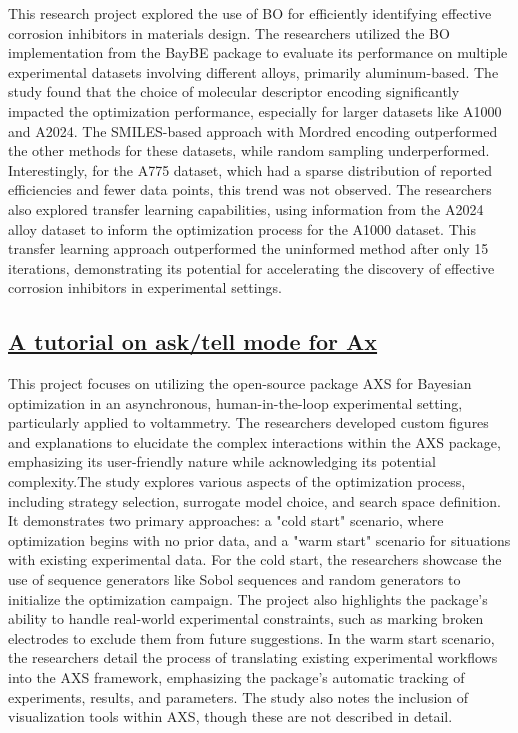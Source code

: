 This research project explored the use of BO for efficiently identifying effective corrosion inhibitors in materials design. The researchers utilized the BO implementation from the BayBE package\cite{fitzner2022baybe} to evaluate its performance on multiple experimental datasets\cite{galvao2022cordata} involving different alloys, primarily aluminum-based. The study found that the choice of molecular descriptor encoding significantly impacted the optimization performance, especially for larger datasets like A1000 and A2024. The SMILES-based approach with Mordred encoding\cite{moriwaki2018mordred} outperformed the other methods for these datasets, while random sampling underperformed. Interestingly, for the A775 dataset, which had a sparse distribution of reported efficiencies and fewer data points, this trend was not observed. The researchers also explored transfer learning capabilities, using information from the A2024 alloy dataset to inform the optimization process for the A1000 dataset. This transfer learning approach outperformed the uninformed method after only 15 iterations, demonstrating its potential for accelerating the discovery of effective corrosion inhibitors in experimental settings.
 \subsection*{\href{https://www.youtube.com/watch?v=X5PDvdXoBdA}{A tutorial on ask/tell mode for Ax}}

This project focuses on utilizing the open-source package AXS for Bayesian optimization in an asynchronous, human-in-the-loop experimental setting, particularly applied to voltammetry. The researchers developed custom figures and explanations to elucidate the complex interactions within the AXS package, emphasizing its user-friendly nature while acknowledging its potential complexity.The study explores various aspects of the optimization process, including strategy selection, surrogate model choice, and search space definition. It demonstrates two primary approaches: a "cold start" scenario, where optimization begins with no prior data, and a "warm start" scenario for situations with existing experimental data. For the cold start, the researchers showcase the use of sequence generators like Sobol sequences and random generators to initialize the optimization campaign. The project also highlights the package's ability to handle real-world experimental constraints, such as marking broken electrodes to exclude them from future suggestions. In the warm start scenario, the researchers detail the process of translating existing experimental workflows into the AXS framework, emphasizing the package's automatic tracking of experiments, results, and parameters. The study also notes the inclusion of visualization tools within AXS, though these are not described in detail.
